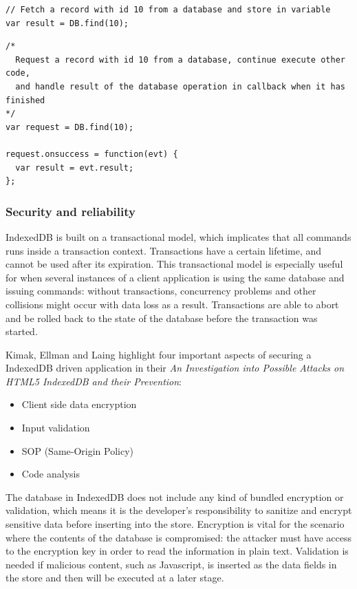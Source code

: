 \begin{Code}
\begin{lstlisting}[caption={Synchronous call}, label={lst:syncCall}]
// Fetch a record with id 10 from a database and store in variable
var result = DB.find(10);
\end{lstlisting}

\begin{lstlisting}[caption={Asynchronous call}, label={lst:asyncCall}]
/*
  Request a record with id 10 from a database, continue execute other code,
  and handle result of the database operation in callback when it has finished
*/
var request = DB.find(10);

request.onsuccess = function(evt) {
  var result = evt.result;
};
\end{lstlisting}
\end{Code}

\subsubsection{Security and reliability}
\label{subsec:security}
IndexedDB is built on a transactional model, which implicates that all commands runs inside a transaction context. Transactions have a certain lifetime, and cannot be used after its expiration. This transactional model is especially useful for when several instances of a client application is using the same database and issuing commands: without transactions, concurrency problems and other collisions might occur with data loss as a result. Transactions are able to abort and be rolled back to the state of the database before the transaction was started.

Kimak, Ellman and Laing highlight four important aspects of securing a IndexedDB driven application in their \emph{An Investigation into Possible Attacks on HTML5 IndexedDB and their Prevention}\cite{IndexedDBSecurity:2012:Online}:

\begin{itemize}
  \item Client side data encryption
  \item Input validation
  \item SOP (Same-Origin Policy)
  \item Code analysis
\end{itemize}

The database in IndexedDB does not include any kind of bundled encryption or validation, which means it is the developer's responsibility to sanitize and encrypt sensitive data before inserting into the store. Encryption is vital for the scenario where the contents of the database is compromised: the attacker must have access to the encryption key in order to read the information in plain text. Validation is needed if malicious content, such as Javascript, is inserted as the data fields in the store and then will be executed at a later stage.

